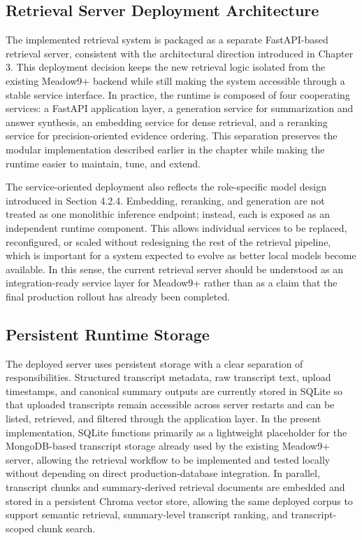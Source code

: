 \subsection{Retrieval Server Deployment Architecture}
The implemented retrieval system is packaged as a separate FastAPI-based retrieval server, consistent with the architectural direction introduced in Chapter 3. This deployment decision keeps the new retrieval logic isolated from the existing Meadow9+ backend while still making the system accessible through a stable service interface. In practice, the runtime is composed of four cooperating services: a FastAPI application layer, a generation service for summarization and answer synthesis, an embedding service for dense retrieval, and a reranking service for precision-oriented evidence ordering. This separation preserves the modular implementation described earlier in the chapter while making the runtime easier to maintain, tune, and extend.\cite{fastapi_docs,pydantic_docs,llama_cpp_server}

The service-oriented deployment also reflects the role-specific model design introduced in Section 4.2.4. Embedding, reranking, and generation are not treated as one monolithic inference endpoint; instead, each is exposed as an independent runtime component. This allows individual services to be replaced, reconfigured, or scaled without redesigning the rest of the retrieval pipeline, which is important for a system expected to evolve as better local models become available. In this sense, the current retrieval server should be understood as an integration-ready service layer for Meadow9+ rather than as a claim that the final production rollout has already been completed.

\subsection{Persistent Runtime Storage}
The deployed server uses persistent storage with a clear separation of responsibilities. Structured transcript metadata, raw transcript text, upload timestamps, and canonical summary outputs are currently stored in SQLite so that uploaded transcripts remain accessible across server restarts and can be listed, retrieved, and filtered through the application layer. In the present implementation, SQLite functions primarily as a lightweight placeholder for the MongoDB-based transcript storage already used by the existing Meadow9+ server, allowing the retrieval workflow to be implemented and tested locally without depending on direct production-database integration. In parallel, transcript chunks and summary-derived retrieval documents are embedded and stored in a persistent Chroma vector store, allowing the same deployed corpus to support semantic retrieval, summary-level transcript ranking, and transcript-scoped chunk search.\cite{langchain_chroma,chroma_persistence_sqlite}

